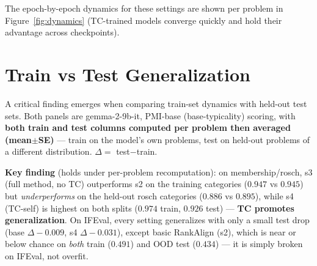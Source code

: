 \documentclass[11pt,a4paper]{article}
\begin{document}
\noindent The epoch-by-epoch dynamics for these settings are shown per problem in
Figure~\ref{fig:dynamics} (TC-trained models converge quickly and hold their advantage across
checkpoints).

\section{Train vs Test Generalization}

A critical finding emerges when comparing train-set dynamics with held-out test sets. Both panels
are gemma-2-9b-it, PMI-base (base-typicality) scoring, with \textbf{both train and test columns
computed per problem then averaged (mean$\pm$SE)} --- train on the model's own problems, test on
held-out problems of a different distribution. $\Delta=$ test$-$train.

\begin{table}[H]
\centering
\caption{Membership TRAIN (68 categories) vs.\ rosch TEST (10 held-out categories), per-category
mean$\pm$SE. s1 is shown only where both splits have it; s5/s11 are omitted (their per-category
rosch-test source no longer exists on disk and the raw s5/s11 rosch-test scores were not retained,
so they cannot be recomputed without re-evaluation); s7 (neg-TC) is excluded from this PMI-base
comparison.}
\label{tab:train_test}

\end{table}

\begin{table}[H]
\centering
\caption{IFEval TRAIN (79 prompts) vs.\ IFEval-OOD TEST (20 held-out prompts), per-prompt
mean$\pm$SE. PMI-base scoring (self-TC settings + base).}
\label{tab:train_test_ifeval}

\end{table}

\textbf{Key finding} (holds under per-problem recomputation): on membership/rosch, s3 (full method,
no TC) outperforms s2 on the training categories ($0.947$ vs $0.945$) but \emph{underperforms} on
the held-out rosch categories ($0.886$ vs $0.895$), while s4 (TC-self) is highest on both splits
($0.974$ train, $0.926$ test) --- \textbf{TC promotes generalization}. On IFEval, every setting
generalizes with only a small test drop (base $\Delta-0.009$, s4 $\Delta-0.031$), except basic
RankAlign (s2), which is near or below chance on \emph{both} train ($0.491$) and OOD test
($0.434$) --- it is simply broken on IFEval, not overfit.
\end{document}
